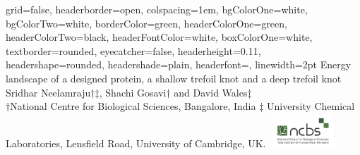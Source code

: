 \documentclass[a0paper,portrait]{baposter}
\begin{document}
\begin{poster}
{
grid=false,
headerborder=open, %
colspacing=1em, %
bgColorOne=white, %
bgColorTwo=white, %
borderColor=green, %
headerColorOne=green, %
headerColorTwo=black, %
headerFontColor=white, %
boxColorOne=white, %
textborder=rounded, %
eyecatcher=false, %
headerheight=0.11\textheight, %
headershape=rounded, %
headershade=plain,
headerfont=\Large\textsf, %
linewidth=2pt %
}
{}
%
%
{
\textsf %
{Energy landscape of a designed protein, a shallow trefoil knot and a deep trefoil knot
}
}
{\sf\vspace{0.2em}\\
Sridhar Neelamraju$\dagger$$\ddagger$, Shachi Gosavi$\dagger$ and David Wales$\ddagger$
\vspace{0.1em}\\
\small{$\dagger$National Centre for Biological Sciences, Bangalore, India $\ddagger$ University Chemical Laboratories, Lensfield Road, University of Cambridge, UK.
\vspace{0.2em}}
}
{\includegraphics[height=0.5in, width=1in]{logo_ncbs.jpg}} %
	


\end{poster}
\end{document}
